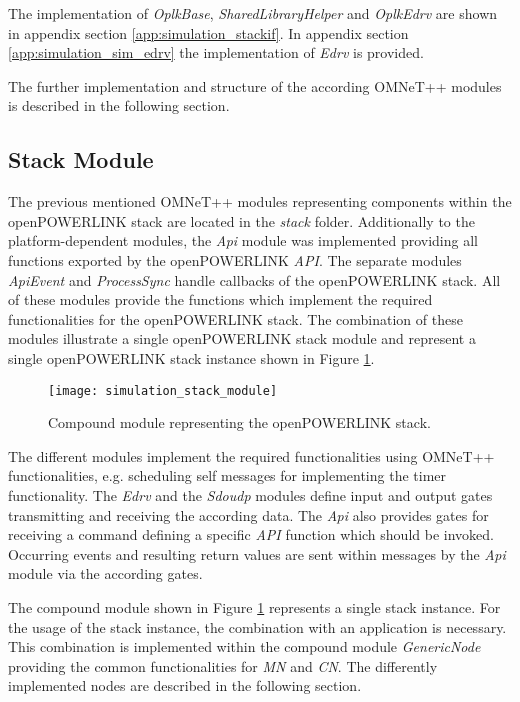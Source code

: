 The implementation of \emph{OplkBase}, \emph{SharedLibraryHelper} and \emph{OplkEdrv} are shown in appendix section \ref{app:simulation_stackif}.
In appendix section \ref{app:simulation_sim_edrv} the implementation of \emph{Edrv} is provided.

The further implementation and structure of the according OMNeT++ modules is described in the following section.

\subsection{Stack Module}
\label{sec:porting_stack_stackmodule}

\begin{sloppypar}
The previous mentioned OMNeT++ modules representing components within the openPOWERLINK stack are located in the \emph{stack} folder.
Additionally to the platform-dependent modules, the \emph{Api} module was implemented providing all functions exported by the openPOWERLINK \emph{API}.
The separate modules \emph{ApiEvent} and \emph{ProcessSync} handle callbacks of the openPOWERLINK stack.
All of these modules provide the functions which implement the required functionalities for the openPOWERLINK stack.
The combination of these modules illustrate a single openPOWERLINK stack module and represent a single openPOWERLINK stack instance shown in Figure \ref{fig:simulation_stack_module}.
\end{sloppypar}

\begin{figure}
    \centering
    \texttt{[image: simulation\_stack\_module]}
    \caption{Compound module representing the openPOWERLINK stack.}
    \label{fig:simulation_stack_module}
\end{figure}

\begin{sloppypar}
The different modules implement the required functionalities using OMNeT++ functionalities, e.g. scheduling self messages for implementing the timer functionality.
The \emph{Edrv} and the \emph{Sdoudp} modules define input and output gates transmitting and receiving the according data.
The \emph{Api} also provides gates for receiving a command defining a specific \emph{API} function which should be invoked.
Occurring events and resulting return values are sent within messages by the \emph{Api} module via the according gates.
\end{sloppypar}

The compound module shown in Figure  \ref{fig:simulation_stack_module} represents a single stack instance.
For the usage of the stack instance, the combination with an application is necessary.
This combination is implemented within the compound module \emph{GenericNode} providing the common functionalities for \emph{MN} and \emph{CN}.
The differently implemented nodes are described in the following section.

